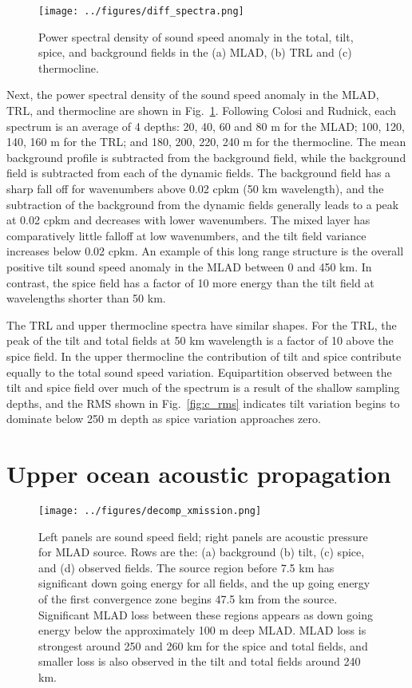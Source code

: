 \documentclass[preprint,NumberedRefs]{JASA}
\begin{document}
\begin{figure}
\texttt{[image: ../figures/diff\_spectra.png]}
        \caption{\label{fig:spectra}{Power spectral density of sound speed anomaly in the total, tilt, spice, and background fields in the (a) MLAD, (b) TRL and (c) thermocline.}}
\end{figure}
Next, the power spectral density of the sound speed anomaly in the MLAD, TRL, and thermocline are shown in Fig.~\ref{fig:spectra}. Following Colosi and Rudnick\cite{colosi2020observations}, each spectrum is an average of 4 depths: 20, 40, 60 and 80 m for the MLAD; 100, 120, 140, 160 m for the TRL; and 180, 200, 220, 240 m for the thermocline. The mean background profile is subtracted from the background field, while the background field is subtracted from each of the dynamic fields. The background field has a sharp fall off for wavenumbers above 0.02 cpkm (50 km wavelength), and the subtraction of the background from the dynamic fields generally leads to a peak at 0.02 cpkm and decreases with lower wavenumbers. The mixed layer has comparatively little falloff at low wavenumbers, and the tilt field variance increases below 0.02 cpkm. An example of this long range structure is the overall positive tilt sound speed anomaly in the MLAD between 0 and 450 km. In contrast, the spice field has a factor of 10 more energy than the tilt field at wavelengths shorter than 50 km.

The TRL and upper thermocline spectra have similar shapes. For the TRL, the peak of the tilt and total fields at 50 km wavelength is a factor of 10 above the spice field. In the upper thermocline the contribution of tilt and spice contribute equally to the total sound speed variation. Equipartition observed between the tilt and spice field over much of the spectrum is a result of the shallow sampling depths, and the RMS shown in Fig.~\ref{fig:c_rms} indicates tilt variation begins to dominate below 250 m depth as spice variation approaches zero.

\section{\label{sec:propagation}Upper ocean acoustic propagation}
\begin{figure}
\texttt{[image: ../figures/decomp\_xmission.png]}
    \caption{\label{fig:decomp_x}{Left panels are sound speed field; right panels are acoustic pressure for MLAD source. Rows are the: (a) background (b) tilt, (c) spice, and (d) observed fields. The source region before 7.5 km has significant down going energy for all fields, and the up going energy of the first convergence zone begins 47.5 km from the source. Significant MLAD loss between these regions appears as down going energy below the approximately 100 m deep MLAD. MLAD loss is strongest around 250 and 260 km for the spice and total fields, and smaller loss is also observed in the tilt and total fields around 240 km.}}
\end{figure}
\end{document}
